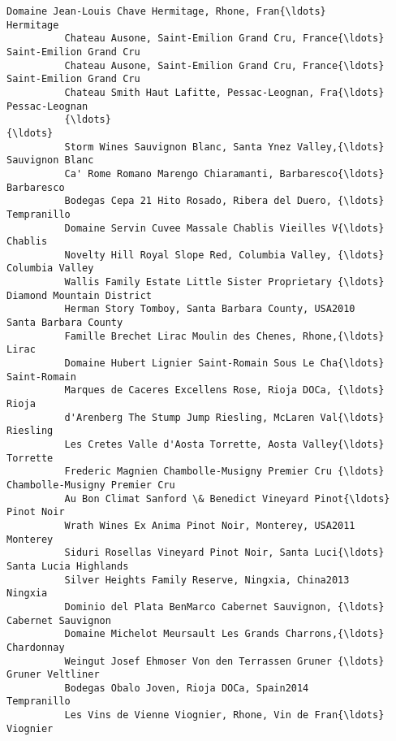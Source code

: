 \documentclass[11pt]{article}
\begin{document}
\begin{Verbatim}[commandchars=\\\{\}]
          Domaine Jean-Louis Chave Hermitage, Rhone, Fran{\ldots}                      Hermitage   
          Chateau Ausone, Saint-Emilion Grand Cru, France{\ldots}        Saint-Emilion Grand Cru   
          Chateau Ausone, Saint-Emilion Grand Cru, France{\ldots}        Saint-Emilion Grand Cru   
          Chateau Smith Haut Lafitte, Pessac-Leognan, Fra{\ldots}                 Pessac-Leognan   
          {\ldots}                                                                           {\ldots}   
          Storm Wines Sauvignon Blanc, Santa Ynez Valley,{\ldots}                Sauvignon Blanc   
          Ca' Rome Romano Marengo Chiaramanti, Barbaresco{\ldots}                     Barbaresco   
          Bodegas Cepa 21 Hito Rosado, Ribera del Duero, {\ldots}                    Tempranillo   
          Domaine Servin Cuvee Massale Chablis Vieilles V{\ldots}                        Chablis   
          Novelty Hill Royal Slope Red, Columbia Valley, {\ldots}                Columbia Valley   
          Wallis Family Estate Little Sister Proprietary {\ldots}      Diamond Mountain District   
          Herman Story Tomboy, Santa Barbara County, USA2010           Santa Barbara County   
          Famille Brechet Lirac Moulin des Chenes, Rhone,{\ldots}                          Lirac   
          Domaine Hubert Lignier Saint-Romain Sous Le Cha{\ldots}                   Saint-Romain   
          Marques de Caceres Excellens Rose, Rioja DOCa, {\ldots}                          Rioja   
          d'Arenberg The Stump Jump Riesling, McLaren Val{\ldots}                       Riesling   
          Les Cretes Valle d'Aosta Torrette, Aosta Valley{\ldots}                       Torrette   
          Frederic Magnien Chambolle-Musigny Premier Cru {\ldots}  Chambolle-Musigny Premier Cru   
          Au Bon Climat Sanford \& Benedict Vineyard Pinot{\ldots}                     Pinot Noir   
          Wrath Wines Ex Anima Pinot Noir, Monterey, USA2011                       Monterey   
          Siduri Rosellas Vineyard Pinot Noir, Santa Luci{\ldots}          Santa Lucia Highlands   
          Silver Heights Family Reserve, Ningxia, China2013                         Ningxia   
          Dominio del Plata BenMarco Cabernet Sauvignon, {\ldots}             Cabernet Sauvignon   
          Domaine Michelot Meursault Les Grands Charrons,{\ldots}                     Chardonnay   
          Weingut Josef Ehmoser Von den Terrassen Gruner {\ldots}               Gruner Veltliner   
          Bodegas Obalo Joven, Rioja DOCa, Spain2014                            Tempranillo   
          Les Vins de Vienne Viognier, Rhone, Vin de Fran{\ldots}                       Viognier   

\end{Verbatim}
\end{document}
